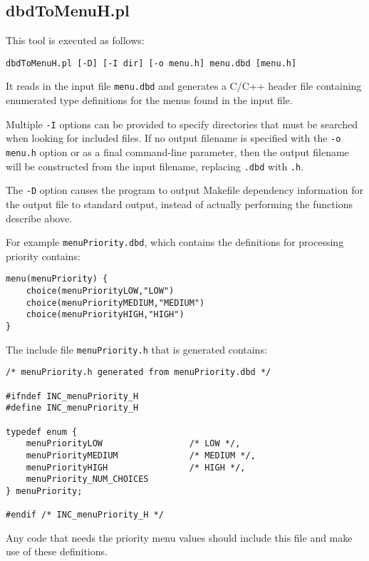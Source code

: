 \subsection{dbdToMenuH.pl}

This tool is executed as follows:

\begin{verbatim}
dbdToMenuH.pl [-D] [-I dir] [-o menu.h] menu.dbd [menu.h]
\end{verbatim}

It reads in the input file \verb|menu.dbd| and generates a C/C++ header file containing enumerated type definitions for the menus found in the input file.

Multiple \verb|-I| options can be provided to specify directories that must be searched when looking for included files.
If no output filename is specified with the \verb|-o menu.h| option or as a final command-line parameter, then the output filename will be constructed from the input filename, replacing \verb|.dbd| with \verb|.h|.

The \verb|-D| option causes the program to output Makefile dependency information for the output file to standard output, instead of actually performing the functions describe above.

For example \verb|menuPriority.dbd|, which contains the definitions for processing priority contains:

\begin{verbatim}
menu(menuPriority) {
    choice(menuPriorityLOW,"LOW")
    choice(menuPriorityMEDIUM,"MEDIUM")
    choice(menuPriorityHIGH,"HIGH")
}
\end{verbatim}

The include file \verb|menuPriority.h| that is generated contains:

\begin{verbatim}
/* menuPriority.h generated from menuPriority.dbd */

#ifndef INC_menuPriority_H
#define INC_menuPriority_H

typedef enum {
    menuPriorityLOW                 /* LOW */,
    menuPriorityMEDIUM              /* MEDIUM */,
    menuPriorityHIGH                /* HIGH */,
    menuPriority_NUM_CHOICES
} menuPriority;

#endif /* INC_menuPriority_H */
\end{verbatim}

Any code that needs the priority menu values should include this file and make use of these definitions.

